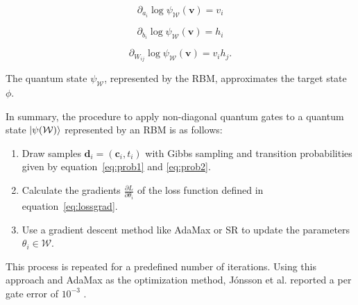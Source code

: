 \begin{equation}
    \partial_{a_i}\log{\psi_{\mathcal{W}}(\bm{v})} = v_i
\end{equation}

\begin{equation}
    \partial_{b_i}\log{\psi_{\mathcal{W}}(\bm{v})} = h_i
\end{equation}

\begin{equation}
    \partial_{W_{ij}}\log{\psi_{\mathcal{W}}(\bm{v})} = v_ih_j.
\end{equation}

The quantum state $\psi_{\mathcal{W}}$, represented by the RBM, approximates the target state $\phi$. 

In summary, the procedure to apply non-diagonal quantum gates to a quantum state $\Ket{\psi(\mathcal{W})}$
represented by an RBM is as follows:

\begin{enumerate}
    \item Draw samples $\bm{d}_i = (\bm{c}_i, t_i)$ with Gibbs sampling and transition probabilities given by equation~\ref{eq:prob1} and \ref{eq:prob2}.
    \item Calculate the gradients $\frac{\partial L}{\partial \theta_i}$ of the loss function defined in equation~\ref{eq:lossgrad}.
    \item Use a gradient descent method like AdaMax or SR to update the parameters $\theta_i \in \mathcal{W}$.
\end{enumerate}

This process is repeated for a predefined number of iterations. Using this approach and AdaMax as the optimization method, J\'{o}nsson et al. reported a per gate error of $10^{-3}$ \cite{jnsson2018neuralnetwork}.

